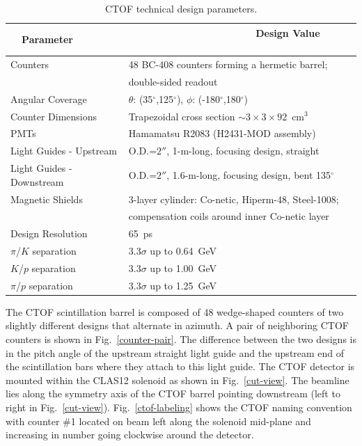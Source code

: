 \documentclass[12pt]{article}
\begin{document}
\begin{table}[htbp]
\begin{center}
\begin{tabular} {|l|l|} \hline
~~Parameter~~ &~~~~~~~~~~~~~~~~~~~~~~ Design Value ~~~~~~~~~~\\ \hline \hline
Counters                  & 48 BC-408 counters forming a hermetic barrel; \\
                          & double-sided readout                   \\ \hline
Angular Coverage          & $\theta$: (35$^\circ$,125$^\circ$), $\phi$: (-180$^\circ$,180$^\circ$) \\ \hline
Counter Dimensions        & Trapezoidal cross section $\sim 3 \times 3 \times 92$~cm$^3$ \\ \hline
PMTs                      & Hamamatsu R2083 (H2431-MOD assembly)    \\ \hline
Light Guides - Upstream   & O.D.=$2''$, 1-m-long, focusing design, straight \\ \hline
Light Guides - Downstream & O.D.=$2''$, 1.6-m-long, focusing design, bent 135$^\circ$ \\ \hline
Magnetic Shields          & 3-layer cylinder: Co-netic, Hiperm-48, Steel-1008; \\ 
                          & compensation coils around inner Co-netic layer \\ \hline
Design Resolution         & 65~ps \\ \hline
$\pi$/$K$ separation      & 3.3$\sigma$ up to 0.64~GeV \\ \hline
$K$/$p$ separation        & 3.3$\sigma$ up to 1.00~GeV \\ \hline
$\pi$/$p$ separation      & 3.3$\sigma$ up to 1.25~GeV \\ \hline
\end{tabular}
\end{center}
\caption{CTOF technical design parameters.}
\label{details}
\end{table}

The CTOF scintillation barrel is composed of 48 wedge-shaped counters of two slightly different 
designs that alternate in azimuth. A pair of neighboring CTOF counters is shown in 
Fig.~\ref{counter-pair}. The difference between the two designs is in the pitch angle of the 
upstream straight light guide and the upstream end of the scintillation bars where they attach 
to this light guide. The CTOF detector is mounted within the CLAS12 solenoid as shown in 
Fig.~\ref{cut-view}. The beamline lies along the symmetry axis of the CTOF barrel pointing 
downstream (left to right in Fig.~\ref{cut-view}). Fig.~\ref{ctof-labeling} shows the CTOF naming 
convention with counter \#1 located on beam left along the solenoid mid-plane and increasing in 
number going clockwise around the detector.
\end{document}
